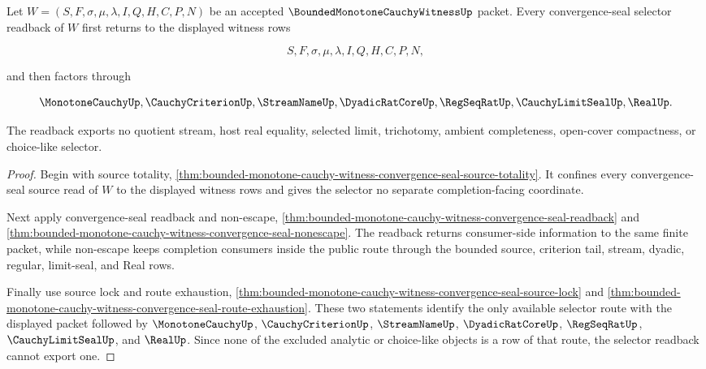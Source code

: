 \begin{theorem}
\label{thm:bounded-monotone-cauchy-witness-convergence-seal-selector-readback}
Let $W=(S,F,\sigma,\mu,\lambda,I,Q,H,C,P,N)$ be an accepted $\BoundedMonotoneCauchyWitnessUp$ packet. Every convergence-seal selector readback of $W$ first returns to the displayed witness rows

$$
S,F,\sigma,\mu,\lambda,I,Q,H,C,P,N,
$$

and then factors through

$$
\MonotoneCauchyUp,\CauchyCriterionUp,\StreamNameUp,\DyadicRatCoreUp,\RegSeqRatUp,\CauchyLimitSealUp,\RealUp.
$$

The readback exports no quotient stream, host real equality, selected limit, trichotomy, ambient completeness, open-cover compactness, or choice-like selector.
\end{theorem}
\begin{proof}
Begin with source totality, \autoref{thm:bounded-monotone-cauchy-witness-convergence-seal-source-totality}. It confines every convergence-seal source read of $W$ to the displayed witness rows and gives the selector no separate completion-facing coordinate.

Next apply convergence-seal readback and non-escape, \autoref{thm:bounded-monotone-cauchy-witness-convergence-seal-readback} and \autoref{thm:bounded-monotone-cauchy-witness-convergence-seal-nonescape}. The readback returns consumer-side information to the same finite packet, while non-escape keeps completion consumers inside the public route through the bounded source, criterion tail, stream, dyadic, regular, limit-seal, and Real rows.

Finally use source lock and route exhaustion, \autoref{thm:bounded-monotone-cauchy-witness-convergence-seal-source-lock} and \autoref{thm:bounded-monotone-cauchy-witness-convergence-seal-route-exhaustion}. These two statements identify the only available selector route with the displayed packet followed by $\MonotoneCauchyUp$, $\CauchyCriterionUp$, $\StreamNameUp$, $\DyadicRatCoreUp$, $\RegSeqRatUp$, $\CauchyLimitSealUp$, and $\RealUp$. Since none of the excluded analytic or choice-like objects is a row of that route, the selector readback cannot export one.
\end{proof}

